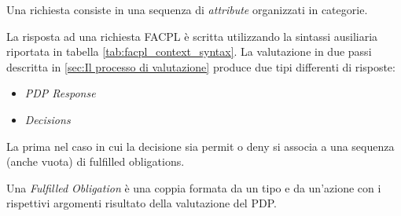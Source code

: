Una richiesta consiste in una sequenza di \emph{attribute} organizzati in categorie.\par
La risposta ad una richiesta FACPL è scritta utilizzando la sintassi ausiliaria riportata in tabella \ref{tab:facpl_context_syntax}.
La valutazione in due passi descritta in \ref{sec:Il processo di valutazione} produce due tipi differenti di risposte:
\begin{itemize}
  \item \emph{PDP Response}
  \item \emph{Decisions}
\end{itemize}
La prima nel caso in cui la decisione sia permit o deny si associa a una sequenza (anche vuota) di fulfilled obligations.\par
Una \emph{Fulfilled Obligation} è una coppia formata da un tipo e da un'azione con i rispettivi argomenti risultato della
valutazione del PDP.



